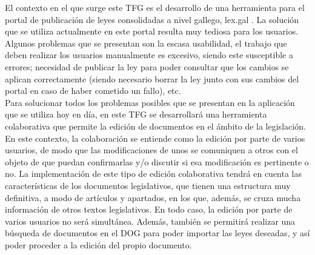 El contexto en el que surge este TFG es el desarrollo de una herramienta para el portal de publicación de leyes consolidadas a nivel gallego, lex.gal \cite{lexgal}. La solución que se utiliza actualmente en este portal resulta muy tediosa para los usuarios. Algunos problemas que se presentan son la escasa usabilidad, el trabajo que deben realizar los usuarios manualmente es excesivo, siendo este susceptible a errores; necesidad de publicar la ley para poder consultar que los cambios se aplican correctamente (siendo necesario borrar la ley junto con sus cambios del portal en caso de haber cometido un fallo), etc.
\\

Para solucionar todos los problemas posibles que se presentan en la aplicación que se utiliza hoy en día, en este TFG se desarrollará una herramienta colaborativa que permite la edición de documentos en el ámbito de la legislación. En este contexto, la colaboración se entiende como la edición por parte de varios usuarios, de modo que las modificaciones de unos se comuniquen a otros con el objeto de que puedan confirmarlas y/o discutir si esa modificación es pertinente o no. La implementación de este tipo de edición colaborativa tendrá en cuenta las características de los documentos legislativos, que tienen una estructura muy definitiva, a modo de artículos y apartados, en los que, además, se cruza mucha información de otros textos legislativos. En todo caso, la edición por parte de varios usuarios no será simultánea. Además, también se permitirá realizar una búsqueda de documentos en el DOG para poder importar las leyes deseadas, y así poder proceder a la edición del propio documento.